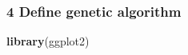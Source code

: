 \documentclass[
]{article}
\newenvironment{Shaded}{\begin{snugshade}}{\end{snugshade}}
\newcommand{\ControlFlowTok}[1]{\textcolor[rgb]{0.13,0.29,0.53}{\textbf{#1}}}
\newcommand{\DecValTok}[1]{\textcolor[rgb]{0.00,0.00,0.81}{#1}}
\newcommand{\KeywordTok}[1]{\textcolor[rgb]{0.13,0.29,0.53}{\textbf{#1}}}
\newcommand{\NormalTok}[1]{#1}
\newcommand{\OperatorTok}[1]{\textcolor[rgb]{0.81,0.36,0.00}{\textbf{#1}}}
\newcommand{\StringTok}[1]{\textcolor[rgb]{0.31,0.60,0.02}{#1}}
\begin{document}
\begin{Shaded}
\end{Shaded}

\hypertarget{define-genetic-algorithm}{%
\subsubsection{4 Define genetic
algorithm}\label{define-genetic-algorithm}}

\begin{Shaded}
\begin{Highlighting}[]
\KeywordTok{library}\NormalTok{(ggplot2)}


\end{Highlighting}
\end{Shaded}
\end{document}
